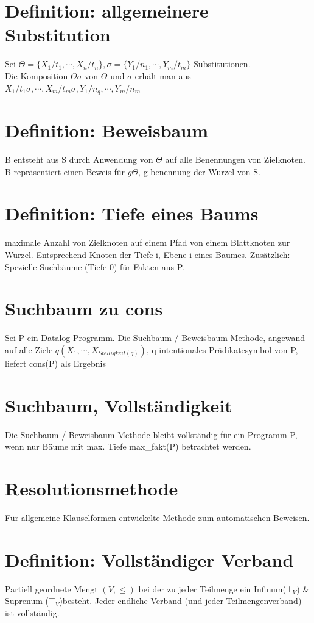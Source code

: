\documentclass[12pt, a4paper]{article}
\begin{document}
\section*{Definition: allgemeinere Substitution}
Sei $\Theta = \{ X_1 / t_1, \cdots, X_n / t_n \}, \sigma = \{ Y_1 / n_1, \cdots, Y_m / t_m \}$ Substitutionen. \\

Die Komposition $\Theta\sigma$ von $\Theta$ und $\sigma$ erhält man aus $X_1 / t_1\sigma, \cdots, X_m / t_m\sigma, Y_1 / n_q, \cdots, Y_m / n_m$

\section*{Definition: Beweisbaum}
B entsteht aus S durch Anwendung von $\Theta$ auf alle Benennungen von Zielknoten. B repräsentiert einen Beweis für $g\Theta$, g benennung der Wurzel von S.

\section*{Definition: Tiefe eines Baums}
maximale Anzahl von Zielknoten auf einem Pfad von einem Blattknoten zur Wurzel. Entsprechend Knoten der Tiefe i, Ebene i eines Baumes. Zusätzlich: Spezielle Suchbäume (Tiefe 0) für Fakten aus P.

\section*{Suchbaum zu cons}
Sei P ein Datalog-Programm. Die Suchbaum  / Beweisbaum Methode, angewand auf alle Ziele $q(X_1, \cdots, X_{Stelligkeit(q)})$, q intentionales Prädikatesymbol von P, liefert cons(P) als Ergebnis

\section*{Suchbaum, Vollständigkeit}
Die Suchbaum / Beweisbaum Methode bleibt vollständig für ein Programm P, wenn nur Bäume mit max. Tiefe max\_fakt(P) betrachtet werden.

\section*{Resolutionsmethode}
Für allgemeine Klauselformen entwickelte Methode zum automatischen Beweisen.


\section*{Definition: Vollständiger Verband}
Partiell geordnete Mengt $(V, \le)$ bei der zu jeder Teilmenge ein Infinum($\bot_V$) \& Suprenum ($\top_V$)besteht.
Jeder endliche Verband (und jeder Teilmengenverband) ist vollständig.
\end{document}
